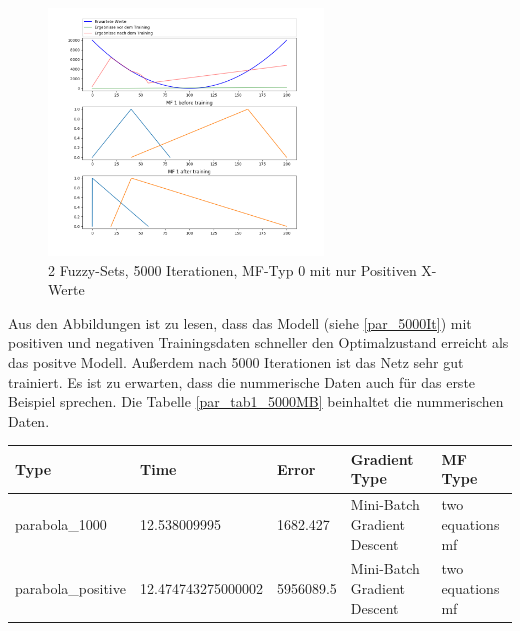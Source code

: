 {\begin{figure}[htbp]
\begin{minipage}{\textwidth}
	\centering
	\includegraphics[width=0.65\textwidth]{images/parabola_positive/Mini-Batch/parabola_positive 1 Input 2 Sets 5000 Epochs Mini-Batch Gradient Descent two equations mf.png}
	\caption{2 Fuzzy-Sets, 5000 Iterationen, MF-Typ 0 mit nur Positiven X-Werte}
	\label{par_pos_5000It}
\end{minipage}
\end{figure}

Aus den Abbildungen ist zu lesen, dass das Modell (siehe \ref{par_5000It}) mit positiven und negativen Trainingsdaten schneller den Optimalzustand erreicht als das positve Modell. Außerdem nach 5000 Iterationen ist das Netz sehr gut trainiert. Es ist zu erwarten, dass die nummerische Daten auch für das erste Beispiel sprechen. Die Tabelle \ref{par_tab1_5000MB} beinhaltet die nummerischen Daten.

\begin{center}
	\begin{minipage}{\textwidth}
		
	
	\begin{tabular}{ | p{3.1cm} | l | l | p{3cm} | p{3cm} |}
		\hline
		Type & Time & Error & Gradient Type & MF Type \\ \hline
		parabola\_1000 & 12.538009995&1682.427&Mini-Batch Gradient Descent&two equations mf
		\\ \hline
		parabola\_positive & 12.474743275000002&5956089.5&Mini-Batch Gradient Descent&two equations mf
		\\ \hline
	\end{tabular}
\label{par_tab1_5000MB}
\end{minipage}
\end{center}

}

